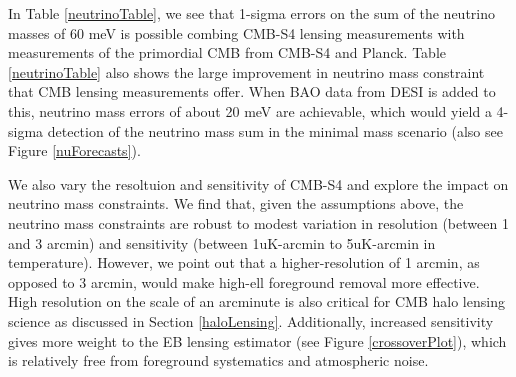In Table \ref{neutrinoTable}, we see that 1-sigma errors on the sum of the neutrino masses of 60 meV is possible combing CMB-S4 lensing measurements with measurements of the primordial CMB from CMB-S4 and Planck.  Table \ref{neutrinoTable} also shows the large improvement in neutrino mass constraint that CMB lensing measurements offer. When BAO data from DESI is added to this, neutrino mass errors of about 20 meV are achievable, which would yield a 4-sigma detection of the neutrino mass sum in the minimal mass scenario (also see Figure \ref{nuForecasts}).  

We also vary the resoltuion and sensitivity of CMB-S4 and explore the impact on neutrino mass constraints.  We find that, given the assumptions above, the neutrino mass constraints are robust to modest variation in resolution (between 1 and 3 arcmin) and sensitivity (between 1uK-arcmin to 5uK-arcmin in temperature).  However, we point out that a higher-resolution of 1 arcmin, as opposed to 3 arcmin, would make high-ell foreground removal more effective.  High resolution on the scale of an arcminute is also critical for CMB halo lensing science as discussed in Section \ref{haloLensing}.  Additionally, increased sensitivity gives more weight to the EB lensing estimator (see Figure \ref{crossoverPlot}), which is relatively free from foreground systematics and atmospheric noise. 









%

%


